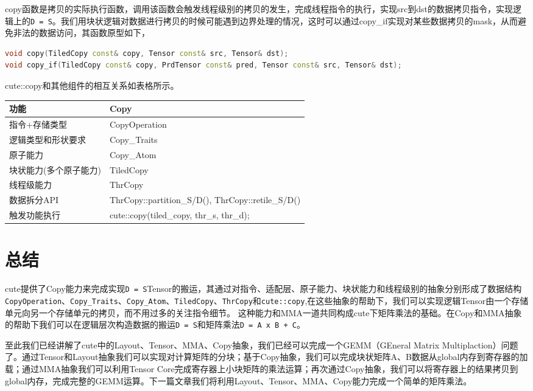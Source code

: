 copy函数是拷贝的实际执行函数，调用该函数会触发线程级别的拷贝的发生，完成线程指令的执行，实现src到dst的数据拷贝指令，实现逻辑上的\verb|D = S|。我们用块状逻辑对数据进行拷贝的时候可能遇到边界处理的情况，这时可以通过copy\_if实现对某些数据拷贝的mask，从而避免非法的数据访问，其函数原型如下，

\begin{lstlisting}[language=C++]
void copy(TiledCopy const& copy, Tensor const& src, Tensor& dst);
void copy_if(TiledCopy const& copy, PrdTensor const& pred, Tensor const& src, Tensor& dst);
\end{lstlisting}

cute::copy和其他组件的相互关系如表格所示。

\begin{center}
\begin{tabular}{ll}
\toprule
功能 & Copy \\
\midrule
指令+存储类型 & CopyOperation \\
逻辑类型和形状要求 & Copy\_Traits \\
原子能力 & Copy\_Atom \\
块状能力(多个原子能力) & TiledCopy \\
线程级能力 & ThrCopy \\
数据拆分API & ThrCopy::partition\_S/D(), ThrCopy::retile\_S/D() \\
触发功能执行 & cute::copy(tiled\_copy, thr\_s, thr\_d); \\
\bottomrule
\end{tabular}
\end{center}

\section{总结}

cute提供了Copy能力来完成实现\verb|D = S|Tensor的搬运，其通过对指令、适配层、原子能力、块状能力和线程级别的抽象分别形成了数据结构\verb|CopyOperation|、\verb|Copy_Traits|、\verb|Copy_Atom|、\verb|TiledCopy|、\verb|ThrCopy|和\verb|cute::copy|,在这些抽象的帮助下，我们可以实现逻辑Tensor由一个存储单元向另一个存储单元的拷贝，而不用过多的关注指令细节。 这种能力和MMA一道共同构成cute下矩阵乘法的基础。在Copy和MMA抽象的帮助下我们可以在逻辑层次构造数据的搬运\verb|D = S|和矩阵乘法\verb|D = A x B + C|。

至此我们已经讲解了cute中的Layout、Tensor、MMA、Copy抽象，我们已经可以完成一个GEMM（GEneral Matrix Multiplaction）问题了。通过Tensor和Layout抽象我们可以实现对计算矩阵的分块；基于Copy抽象，我们可以完成块状矩阵A、B数据从global内存到寄存器的加载；通过MMA抽象我们可以利用Tensor Core完成寄存器上小块矩阵的乘法运算；再次通过Copy抽象，我们可以将寄存器上的结果拷贝到global内存，完成完整的GEMM运算。下一篇文章我们将利用Layout、Tensor、MMA、Copy能力完成一个简单的矩阵乘法。

